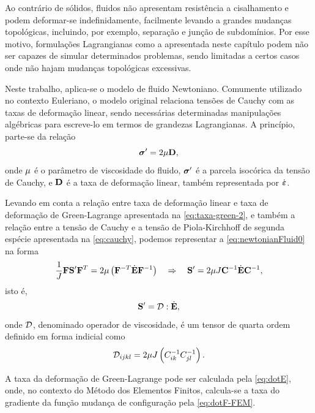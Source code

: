 \documentclass[Tese.tex]{subfiles}
\begin{document}
Ao contrário de sólidos, fluidos não apresentam resistência a cisalhamento e podem deformar-se indefinidamente, facilmente levando a grandes mudanças topológicas, incluindo, por exemplo, separação e junção de subdomínios. Por esse motivo, formulações Lagrangianas como a apresentada neste capítulo podem não ser capazes de simular determinados problemas, sendo limitadas a certos casos onde não hajam mudanças topológicas excessivas.

Neste trabalho, aplica-se o modelo de fluido Newtoniano. Comumente utilizado no contexto Euleriano, o modelo original relaciona tensões de Cauchy com as taxas de deformação linear, sendo necessárias determinadas manipulações algébricas para escreve-lo em termos de grandezas Lagrangianas. A princípio, parte-se da relação
\begin{equation}\label{eq:newtonianFluid0}
\boldsymbol{\sigma}' = 2\mu\mathbf{D},
\end{equation}
onde $\mu$ é o parâmetro de viscosidade do fluido, $\boldsymbol{\sigma}'$ é a parcela isocórica da tensão de Cauchy, e $\mathbf{D}$ é a taxa de deformação linear, também representada por $\dot{\boldsymbol{\varepsilon}}$.

Levando em conta a relação entre taxa de deformação linear e taxa de deformação de Green-Lagrange apresentada na \cref{eq:taxa-green-2}, e também a relação entre a tensão de Cauchy e a tensão de Piola-Kirchhoff de segunda espécie apresentada na \cref{eq:cauchy}, podemos representar a \cref{eq:newtonianFluid0} na forma
\begin{equation}\label{eq:newtonianFluid1}
\dfrac{1}{J}\mathbf{F}\mathbf{S}'\mathbf{F}^T = 2\mu\left(\mathbf{F}^{-T}\dot{\mathbf{E}}\mathbf{F}^{-1}\right) \quad\Rightarrow\quad \mathbf{S}' = 2\mu J\mathbf{C}^{-1}\dot{\mathbf{E}}\mathbf{C}^{-1},
\end{equation}
isto é,
\begin{equation}\label{eq:newtonianFluid}
\mathbf{S}' = \mathcal{D}:\dot{\mathbf{E}},
\end{equation}
onde $\mathcal{D}$, denominado operador de viscosidade, é um tensor de quarta ordem definido em forma indicial como
\begin{equation}
\mathcal{D}_{ijkl} = 2\mu J\left(C^{-1}_{ik}C^{-1}_{jl}\right).
\end{equation}

A taxa da deformação de Green-Lagrange pode ser calculada pela \cref{eq:dotE}, onde, no contexto do Método dos Elementos Finitos, calcula-se a taxa do gradiente da função mudança de configuração pela \cref{eq:dotF-FEM}.
\end{document}
